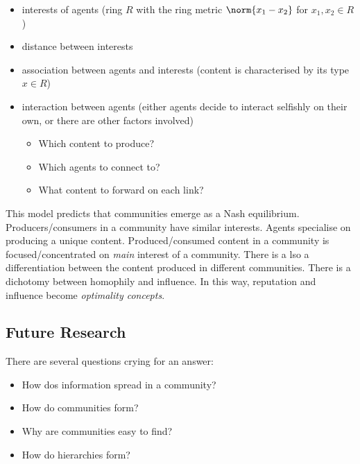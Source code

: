 \documentclass[11pt]{scrartcl}
\begin{document}
\begin{itemize}
\item interests of agents (ring $R$ with the ring metric $\norm{x_1-x_2}$ for $x_1, x_2\in R$)
\item distance between interests
\item association between agents and interests (content is characterised by its type $x\in R$)
\item interaction between agents (either agents decide to interact
  selfishly on their own, or there are other factors involved)
\begin{itemize}
\item Which content to produce?
\item Which agents to connect to?
\item What content to forward on each link?
\end{itemize}
\end{itemize}

This model predicts that communities emerge as a Nash equilibrium.  Producers/consumers in a community have similar interests. Agents specialise on producing a unique content. Produced/consumed content in a community is focused/concentrated on \textit{main} interest of a community. There is a lso a differentiation between the content produced in different communities. There is a dichotomy between homophily and influence. In this way, reputation and influence become \textit{optimality concepts}.

\subsection{Future Research}

There are several questions crying for an answer:
\begin{itemize}
\item How dos information spread in a community?
\item How do communities form?
\item Why are communities easy to find?
\item How do hierarchies form?
\end{itemize}
\end{document}

